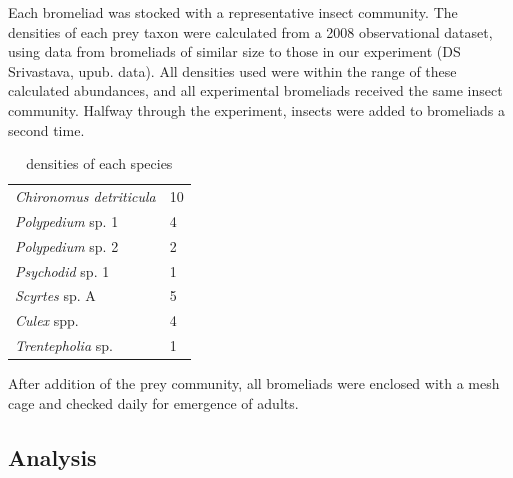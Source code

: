 \documentclass[10pt]{article}
\begin{document}
\begin{spacing}{2}
Each bromeliad was stocked with a representative insect community.
The densities of each prey taxon were calculated from a 2008
observational dataset, using data from bromeliads of similar size to
those in our experiment (DS Srivastava, upub. data).  All densities
used were within the range of these calculated abundances, and all
experimental bromeliads received the same insect community.  Halfway
through the experiment, insects were added to bromeliads a second
time.

\begin{table}
  \centering
  \caption{densities of each species}
  \label{tab:sppden}
  \begin{tabular}{l l}
    \hline
    \emph{Chironomus detriticula} & 10 \\
    \emph{Polypedium} sp. 1 & 4 \\
    \emph{Polypedium} sp. 2 & 2 \\
    \emph{Psychodid} sp. 1 & 1 \\
    \emph{Scyrtes} sp. A & 5 \\
    \emph{Culex} spp. & 4 \\
    \emph{Trentepholia} sp. & 1
  \end{tabular}
\end{table}



After addition of the prey community, all bromeliads were enclosed
with a mesh cage and checked daily for emergence of adults.





\subsection{Analysis}
\label{sec:analy}



\end{spacing}
\end{document}
